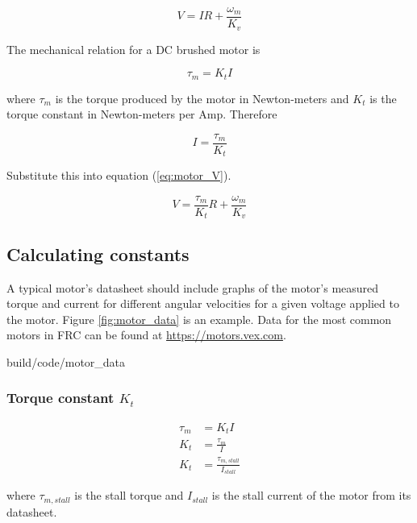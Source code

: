 \begin{equation}
  V = IR + \frac{\omega_m}{K_v} \label{eq:motor_V}
\end{equation}

The mechanical relation for a DC brushed motor is

\begin{equation}
  \tau_m = K_t I \label{eq:motor_tau_m}
\end{equation}

where $\tau_m$ is the torque produced by the motor in Newton-meters and $K_t$ is
the torque constant in Newton-meters per Amp. Therefore

\begin{equation*}
  I = \frac{\tau_m}{K_t}
\end{equation*}

Substitute this into equation (\ref{eq:motor_V}).

\begin{equation}
  V = \frac{\tau_m}{K_t} R + \frac{\omega_m}{K_v} \label{eq:motor_tau_V}
\end{equation}

\subsection{Calculating constants}

A typical motor's datasheet should include graphs of the motor's measured torque
and current for different angular velocities for a given voltage applied to the
motor. Figure \ref{fig:motor_data} is an example. Data for the most common
motors in FRC can be found at \url{https://motors.vex.com}.

\begin{svg}{build/code/motor_data}
  \caption{Example motor datasheet for 775pro}
  \label{fig:motor_data}
\end{svg}

\subsubsection{Torque constant $K_t$}

\begin{align}
  \tau_m &= K_t I \nonumber \\
  K_t &= \frac{\tau_m}{I} \nonumber \\
  K_t &= \frac{\tau_{m,stall}}{I_{stall}}
\end{align}

where $\tau_{m,stall}$ is the stall torque and $I_{stall}$ is the stall current
of the motor from its datasheet.

